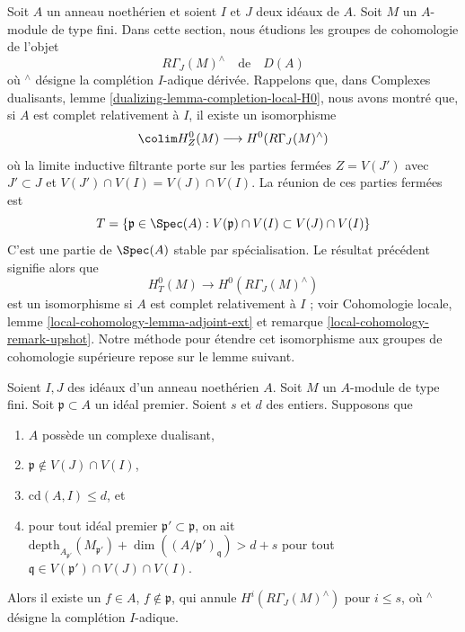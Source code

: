 \noindent
Soit $A$ un anneau noethérien et soient $I$ et $J$ deux idéaux de $A$.
Soit $M$ un $A$-module de type fini. Dans cette section, nous étudions les
groupes de cohomologie de l'objet
$$
R\Gamma_J(M)^\wedge
\quad\text{de}\quad
D(A)
$$
où ${}^\wedge$ désigne la complétion $I$-adique dérivée. Rappelons que, dans
Complexes dualisants, lemme \ref{dualizing-lemma-completion-local-H0},
nous avons montré que, si $A$ est complet relativement à $I$,
il existe un isomorphisme
$$
\colim H^0_Z(M) \longrightarrow H^0(R\Gamma_J(M)^\wedge)
$$
où la limite inductive filtrante porte sur les parties fermées $Z = V(J')$
avec $J' \subset J$ et $V(J') \cap V(I) = V(J) \cap V(I)$.
La réunion de ces parties fermées est
\begin{equation}
\label{equation-associated-subset}
T = \{\mathfrak p \in \Spec(A) :
V(\mathfrak p) \cap V(I) \subset V(J) \cap V(I)\}
\end{equation}
C'est une partie de $\Spec(A)$ stable par spécialisation.
Le résultat précédent signifie alors que
$$
H^0_T(M) \longrightarrow H^0(R\Gamma_J(M)^\wedge)
$$
est un isomorphisme si $A$ est complet relativement à $I$ ; voir
Cohomologie locale, lemme \ref{local-cohomology-lemma-adjoint-ext} et
remarque \ref{local-cohomology-remark-upshot}.
Notre méthode pour étendre cet isomorphisme aux groupes de cohomologie supérieure
repose sur le lemme suivant.

\begin{lemma}
\label{lemma-kill-completion-general}
Soient $I, J$ des idéaux d'un anneau noethérien $A$.
Soit $M$ un $A$-module de type fini. Soit $\mathfrak p \subset A$ un idéal premier.
Soient $s$ et $d$ des entiers. Supposons que
\begin{enumerate}
\item $A$ possède un complexe dualisant,
\item $\mathfrak p \not \in V(J) \cap V(I)$,
\item $\text{cd}(A, I) \leq d$, et
\item pour tout idéal premier $\mathfrak p' \subset \mathfrak p$,
on ait
$\text{depth}_{A_{\mathfrak p'}}(M_{\mathfrak p'}) +
\dim((A/\mathfrak p')_\mathfrak q) > d + s$
pour tout $\mathfrak q \in V(\mathfrak p') \cap V(J) \cap V(I)$.
\end{enumerate}
Alors il existe un $f \in A$, $f \not \in \mathfrak p$, qui annule
$H^i(R\Gamma_J(M)^\wedge)$ pour $i \leq s$, où ${}^\wedge$
désigne la complétion $I$-adique.
\end{lemma}

